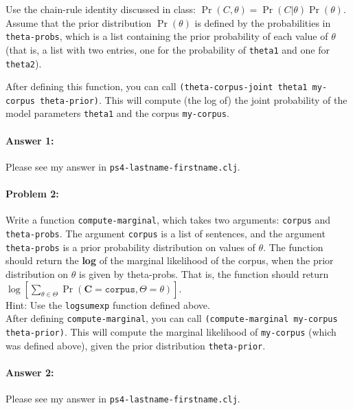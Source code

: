 \documentclass[10pt]{article}
\newcommand{\PSnum}{4}
\begin{document}
Use the chain-rule identity discussed in class:
$\Pr(C,\theta) = \Pr(C|\theta)\Pr(\theta)$. Assume that the prior
distribution $\Pr(\theta)$ is defined by the probabilities in
\texttt{theta-probs}, which is a list containing the prior probability of each value
of $\theta$ (that is, a list with two entries, one for the probability of \texttt{theta1} and one for \texttt{theta2}).

After defining this function, you can call \texttt{(theta-corpus-joint theta1
  my-corpus theta-prior)}. This will compute (the log of) the joint
probability of the model parameters \texttt{theta1} and the corpus
\texttt{my-corpus}.

\paragraph{Answer 1:} Please see my answer in \texttt{ps\PSnum-lastname-firstname.clj}.

\noindent\hrulefill %

\paragraph{Problem 2:}

Write a function \texttt{compute-marginal}, which takes two arguments:
\texttt{corpus} and \texttt{theta-probs}. The argument \texttt{corpus}
is a list of sentences, and the argument \texttt{theta-probs} is a
prior probability distribution on values of $\theta$.
The function should return the \textbf{log} of the marginal likelihood of the
corpus, when the prior distribution on $\theta$ is given by
theta-probs. That is, the function should return
$\log[\sum_{\theta \in \Theta} \Pr(\mathbf{C}=\texttt{corpus}, \Theta=\theta)]$.
\\

\noindent Hint: Use the \texttt{logsumexp} function defined above.
\\

\noindent After defining \texttt{compute-marginal}, you can call
\texttt{(compute-marginal my-corpus theta-prior)}. This will compute
the marginal likelihood of \texttt{my-corpus} (which was defined above), 
given the prior distribution \texttt{theta-prior}.

\paragraph{Answer 2:} Please see my answer in
\texttt{ps\PSnum-lastname-firstname.clj}.
\end{document}
